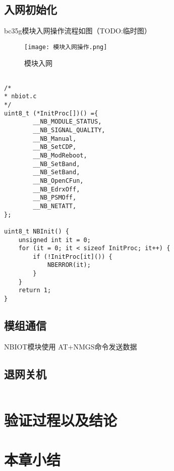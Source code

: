 \subsection{入网初始化}
bc35g模块入网操作流程如图（TODO:临时图）

\begin{figure}[H]
    \centering
	\texttt{[image: 模块入网操作.png]}
	\caption{模块入网}
	\label{模块入网}
\end{figure}

\begin{lstlisting}

/*
* nbiot.c
*/
uint8_t (*InitProc[])() ={
        __NB_MODULE_STATUS,
        __NB_SIGNAL_QUALITY,
        __NB_Manual,
        __NB_SetCDP,
        __NB_ModReboot,
        __NB_SetBand,
        __NB_SetBand,
        __NB_OpenCFun,
        __NB_EdrxOff,
        __NB_PSMOff,
        __NB_NETATT,
};

uint8_t NBInit() {
    unsigned int it = 0;
    for (it = 0; it < sizeof InitProc; it++) {
        if (!InitProc[it]()) {
            NBERROR(it);
        }
    }
    return 1;
}
\end{lstlisting}

\subsection{模组通信}

NBIOT模块使用 AT+NMGS命令发送数据

\subsection{退网关机}
\begin{lstlisting}

\end{lstlisting}


\section{验证过程以及结论}

\section{本章小结}
